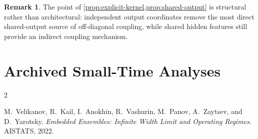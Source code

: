 \documentclass[11pt]{article}
\theoremstyle{definition}
\newtheorem{remark}[theorem]{Remark}
\begin{document}
\begin{remark}
The point of \cref{prop:explicit-kernel,prop:shared-output} is structural rather than architectural:
independent output coordinates remove the most direct shared-output source of off-diagonal coupling,
while shared hidden features still provide an indirect coupling mechanism.
\end{remark}

\section{Archived Small-Time Analyses}



\begin{thebibliography}{2}

M.~Velikanov, R.~Kail, I.~Anokhin, R.~Vashurin, M.~Panov, A.~Zaytsev, and D.~Yarotsky.
\newblock \emph{Embedded Ensembles: Infinite Width Limit and Operating Regimes}.
\newblock AISTATS, 2022.

\end{thebibliography}
\end{document}
